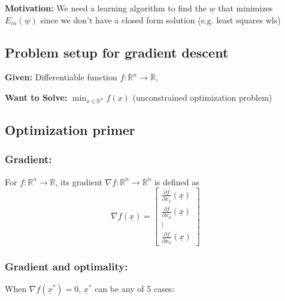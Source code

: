 \textbf{Motivation:} We need a learning algorithm to find the $\underline{w}$ that minimizes $E_{in} (\underline{w})$ since we don't have a closed form solution (e.g. least squares wls)

\subsection{Problem setup for gradient descent}
\begin{intuition}
    \textbf{Given:} Differentiable function $f: \mathbb{R}^n \to \mathbb{R}$, 
    \vspace{1em}

    \textbf{Want to Solve:} $\min_{x \in \mathbb{R}^n} f(x)$ (unconstrained optimization problem)
\end{intuition}

\subsection{Optimization primer}
    \subsubsection{Gradient:}
    \begin{definition}
        For $f: \mathbb{R}^n \to \mathbb{R}$, its gradient $\nabla f: \mathbb{R}^n \to \mathbb{R}^n$ is defined as
            \[
            \nabla f(\underline{x}) =
            \begin{bmatrix}
            \frac{\partial f}{\partial x_1}(\underline{x}) \\
            \frac{\partial f}{\partial x_2}(\underline{x}) \\
            \vdots \\
            \frac{\partial f}{\partial x_n}(\underline{x})
            \end{bmatrix}
            \]
    \end{definition}

    \begin{example}
    \end{example}

    \subsubsection{Gradient and optimality:}
    \begin{definition}
        When $\nabla f(\underline{x}^*) = 0$, $\underline{x}^*$ can be any of 5 cases:

    \end{definition}

